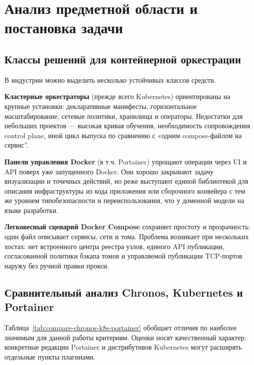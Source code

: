 \section{Анализ предметной области и постановка задачи}

\subsection{Классы решений для контейнерной оркестрации}

В индустрии можно выделить несколько устойчивых классов средств.

\textbf{Кластерные оркестраторы} (прежде всего Kubernetes) ориентированы на крупные установки: декларативные манифесты, горизонтальное масштабирование, сетевые политики, хранилища и операторы. Недостатки для небольших проектов --- высокая кривая обучения, необходимость сопровождения control plane, иной цикл выпуска по сравнению с «одним compose-файлом на сервис''.

\textbf{Панели управления Docker} (в т.ч. Portainer) упрощают операции через UI и API поверх уже запущенного Docker. Они хорошо закрывают задачу визуализации и точечных действий, но реже выступают единой библиотекой для описания инфраструктуры из кода приложения или сборочного конвейера с тем же уровнем типобезопасности и переиспользования, что у доменной модели на языке разработки.

\textbf{Легковесный сценарий Docker Compose} сохраняет простоту и прозрачность: один файл описывает сервисы, сети и тома. Проблема возникает при нескольких хостах: нет встроенного центра реестра узлов, единого API публикации, согласованной политики бэкапа томов и управляемой публикации TCP-портов наружу без ручной правки прокси.

\subsection{Сравнительный анализ Chronos, Kubernetes и Portainer}

Таблица~\ref{tab:compare-chronos-k8s-portainer} обобщает отличия по наиболее значимым для данной работы критериям. Оценки носят качественный характер: конкретные редакции Portainer и дистрибутивов Kubernetes могут расширять отдельные пункты плагинами.

